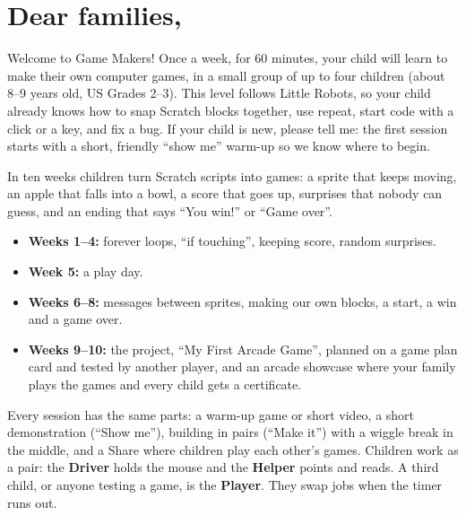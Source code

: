 \documentclass[track=junior,level=2]{kidscode}
\begin{document}

\section{Dear families,}
Welcome to Game Makers! Once a week, for 60 minutes, your child will learn to make their own
computer games, in a small group of up to four children (about 8--9 years old, US Grades 2--3).
This level follows Little Robots, so your child already knows how to snap Scratch blocks together,
use repeat, start code with a click or a key, and fix a bug. If your child is new, please tell me:
the first session starts with a short, friendly \enquote{show me} warm-up so we know where to begin.

In ten weeks children turn Scratch scripts into games: a sprite that keeps moving, an apple that
falls into a bowl, a score that goes up, surprises that nobody can guess, and an ending that says
\enquote{You win!} or \enquote{Game over}.
\begin{itemize}[itemsep=2pt]
  \item \textbf{Weeks 1--4:} forever loops, \enquote{if touching}, keeping score, random surprises.
  \item \textbf{Week 5:} a play day.
  \item \textbf{Weeks 6--8:} messages between sprites, making our own blocks, a start, a win and a game over.
  \item \textbf{Weeks 9--10:} the project, \enquote{My First Arcade Game}, planned on a game plan
        card and tested by another player, and an arcade showcase where your family plays the games
        and every child gets a certificate.
\end{itemize}
Every session has the same parts: a warm-up game or short video, a short demonstration
(\enquote{Show me}), building in pairs (\enquote{Make it}) with a wiggle break in the middle, and a
Share where children play each other's games. Children work as a pair: the \textbf{Driver} holds
the mouse and the \textbf{Helper} points and reads. A third child, or anyone testing a game, is the
\textbf{Player}. They swap jobs when the timer runs out.
\end{document}
